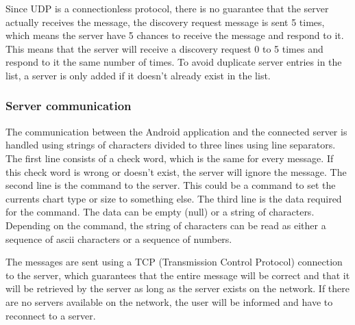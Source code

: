 \documentclass[12pt,a4paper,notitlepage]{report}
\begin{document}
Since UDP is a connectionless protocol, there is no guarantee that the server actually receives the message, the discovery request message is sent 5 times, which means the server have 5 chances to receive the message and respond to it. This means that the server will receive a discovery request 0 to 5 times and respond to it the same number of times. To avoid duplicate server entries in the list, a server is only added if it doesn't already exist in the list.



\subsubsection{Server communication}
The communication between the Android application and the connected server is handled using strings of characters divided to three lines using line separators. The first line consists of a check word, which is the same for every message. If this check word is wrong or doesn't exist, the server will ignore the message. The second line is the command to the server. This could be a command to set the currents chart type or size to something else. The third line is the data required for the command. The data can be empty (null) or a string of characters. Depending on the command, the string of characters can be read as either a sequence of ascii characters or a sequence of numbers.

The messages are sent using a TCP (Transmission Control Protocol) connection to the server, which guarantees that the entire message will be correct and that it will be retrieved by the server as long as the server exists on the network. If there are no servers available on the network, the user will be informed and have to reconnect to a server.
\end{document}
